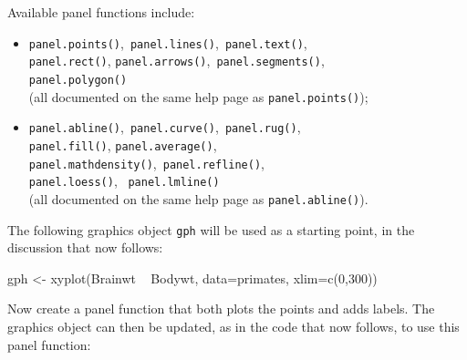 \documentclass{tufte-book}\usepackage[]{graphicx}\usepackage[]{color}
\newcommand{\txtt}[1]{\texttt{#1}}
\begin{document}
Available panel functions include:
\begin{itemize}
\item {}
  \txtt{panel.points()},\, \txtt{panel.lines()},\,
  \txtt{panel.text()},\,\\  \verb!panel.rect()!,
  \verb!panel.arrows()!,\, \verb!panel.segments()!, \,\\
  \verb!panel.polygon()!\,\\ (all documented on the same help
  page as \txtt{panel.points()});
\item \txtt{panel.abline()},\, \txtt{panel.curve()},\,
\txtt{panel.rug()}, \,\\  \verb!panel.fill()!,
\txtt{panel.average()},\,\\  \verb!panel.mathdensity()!,\,
 \verb!panel.refline()!,\\
\verb!panel.loess()!, \, \verb!panel.lmline()!\\
(all
documented on the same help page as \txtt{panel.abline()}).
\end{itemize}

The following graphics object \txtt{gph} will be used as a starting
point, in the discussion that now follows:
\begin{Schunk}
\begin{Sinput}
gph <- xyplot(Brainwt ~ Bodywt,  data=primates,
              xlim=c(0,300))
\end{Sinput}
\end{Schunk}

Now create a panel function that both plots the points and adds
labels. The graphics object can then be updated, as in the code that
now follows, to use this panel function:
\end{document}
